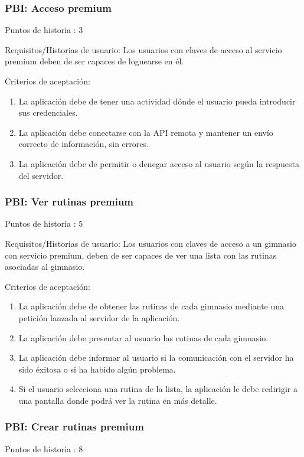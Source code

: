 \documentclass[11pt,a4paper]{report}
\begin{document}
\subsubsection{PBI: Acceso premium}
Puntos de historia : 3

Requisitos/Historias de usuario: Los usuarios con claves de acceso al servicio premium deben de ser capaces de loguearse en él.

Criterios de aceptación:
\begin{enumerate}
	\item La aplicación debe de tener una actividad dónde el usuario pueda introducir sus credenciales.

	\item La aplicación debe conectarse con la API remota y mantener un envío correcto de información, sin errores.

	\item La aplicación debe de permitir o denegar acceso al usuario según la respuesta del servidor.

\end{enumerate}
\subsubsection{PBI: Ver rutinas premium}
Puntos de historia : 5

Requisitos/Historias de usuario: Los usuarios con claves de acceso a un gimnasio con servicio premium, deben de ser capaces de ver una lista con las rutinas asociadas al gimnasio.

Criterios de aceptación:
\begin{enumerate}
	\item La aplicación debe de obtener las rutinas de cada gimnasio mediante una petición lanzada al servidor de la aplicación.

	\item La aplicación debe presentar al usuario las rutinas de cada gimnasio.

	\item La aplicación debe informar al usuario si la comunicación con el servidor ha sido éxitosa o si ha habido algún problema.
	\item Si el usuario selecciona una rutina de la lista, la aplicación le debe redirigir a una pantalla donde podrá ver la rutina en más detalle.

\end{enumerate}
\subsubsection{PBI: Crear rutinas premium}
Puntos de historia : 8
\end{document}
